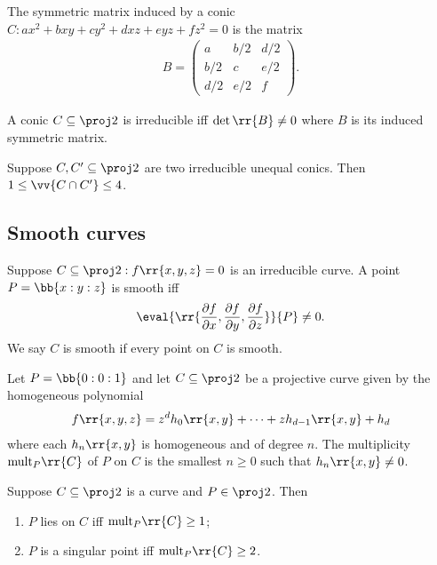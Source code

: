 \documentclass{article}
\begin{document}
\begin{definition}
  The symmetric matrix induced by a conic $C:ax^2 + bxy + cy^2 + dxz + eyz + fz^2 =0$ is the
  matrix
  \begin{align*}
    B =
    \begin{pmatrix}
      a & b/2 & d/2\\
      b/2 & c & e/2\\
      d/2 & e/2 & f
    \end{pmatrix}.
  \end{align*}
\end{definition}

\begin{corollary}
  A conic $C\subseteq\proj 2$ is irreducible iff $\det\rr{B}\neq 0$ where $B$ is its
  induced symmetric matrix.
\end{corollary}

\begin{theorem}
  Suppose $C,C'\subseteq\proj 2$ are two irreducible unequal conics. Then
  $1\leq\vv{C\cap C'}\leq 4$.
\end{theorem}

\subsection{Smooth curves}\label{sec:smooth_curves}

\begin{definition}
  Suppose $C\subseteq\proj 2:f\rr{x,y,z}=0$ is an irreducible curve. A point
  $P=\bb{x:y:z}$ is smooth iff
  \begin{align*}
    \eval{\rr{\frac{\partial f}{\partial x},\frac{\partial f}{\partial y}, \frac{\partial f}{\partial z}}}{P}\neq 0.
  \end{align*}
  We say $C$ is smooth if every point on $C$ is smooth.
\end{definition}

\begin{definition}
  Let $P=\bb{0:0:1}$ and let $C\subseteq\proj 2$ be a projective curve given
  by the homogeneous polynomial
  \begin{align*}
    f\rr{x,y,z}=z^d h_0\rr{x,y} + \cdots + zh_{d-1}\rr{x,y} + h_{d}
  \end{align*}
  where each $h_n\rr{x,y}$ is homogeneous and of degree $n$. The multiplicity
  $\text{mult}_P\rr{C}$ of $P$ on $C$ is the smallest $n\geq 0$ such that $h_n\rr{x,y}\neq 0$.
\end{definition}

\begin{proposition}
  Suppose $C\subseteq\proj 2$ is a curve and $P\in\proj 2$. Then
  \begin{enumerate}
    \item $P$ lies on $C$ iff $\text{mult}_P\rr{C}\geq 1$;
    \item $P$ is a singular point iff $\text{mult}_P\rr{C}\geq 2$.
  \end{enumerate}
\end{proposition}
\end{document}
